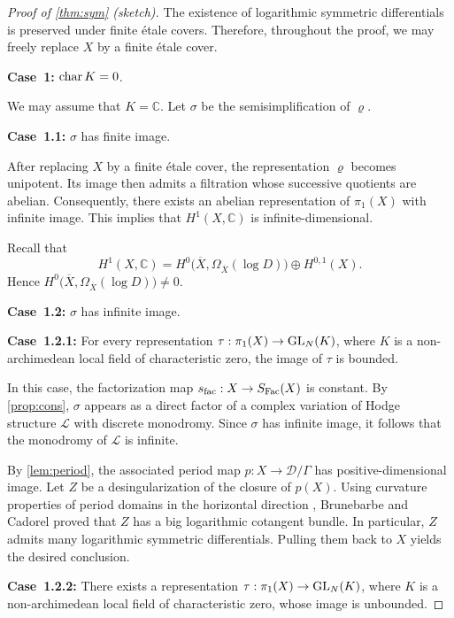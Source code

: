 \documentclass[english]{amsproc}
\theoremstyle{plain}
\theoremstyle{definition}
\theoremstyle{remark}
\theoremstyle{plain}
\numberwithin{equation}{thm} %
\newcommand{\sD}{\mathscr{D}}
\newcommand{\bC}{\mathbb{C}}
\newcommand{\GL}{{\rm GL}}
\begin{document}
\begin{proof}[Proof  of \cref{thm:sym} (sketch)]
	The existence of logarithmic symmetric differentials is preserved under finite \'etale covers.
	Therefore, throughout the proof, we may freely replace $X$ by a finite \'etale cover.
	
	\medskip
	\noindent\textbf{Case~1:} ${\rm char}\, K = 0$.
	
	We may assume that $K=\bC$. Let $\sigma$ be the semisimplification of $\varrho$.
	
	\medskip
	\noindent\textbf{Case~1.1:} $\sigma$ has finite image.
	
	After replacing $X$ by a finite \'etale cover, the representation $\varrho$ becomes unipotent.
	Its image then admits a filtration whose successive quotients are abelian. Consequently,
	there exists an abelian representation of $\pi_1(X)$ with infinite image. This implies that
	$H^1(X,\bC)$ is infinite-dimensional.
	
	Recall that
	\[
	H^1(X,\bC)
	= H^0\bigl(\overline{X}, \Omega_{\overline{X}}(\log D)\bigr)
	\oplus H^{0,1}(X).
	\]
	Hence $H^0\bigl(\overline{X}, \Omega_{\overline{X}}(\log D)\bigr)\neq 0$.
	
	\medskip
	\noindent\textbf{Case~1.2:} $\sigma$ has infinite image.
	
	\medskip
	\noindent\textbf{Case~1.2.1:}  
	For every representation $\tau:\pi_1(X)\to \GL_N(K)$, where $K$ is a non-archimedean local
	field of characteristic zero, the image of $\tau$ is bounded.
	
In this case, the factorization map \(s_{\rm fac}: X \to S_{\rm Fac}(X)\) is constant. 
By \cref{prop:cons}, \(\sigma\) appears as a direct factor of a complex variation of Hodge 
structure \(\mathcal{L}\) with discrete monodromy. 
Since \(\sigma\) has infinite image, it follows that the monodromy of \(\mathcal{L}\) is infinite.
	
	By \cref{lem:period}, the associated period map $p:X\to \sD/\Gamma$ has positive-dimensional
	image. Let $Z$ be a desingularization of the closure of $p(X)$. Using curvature properties
	of period domains in the horizontal direction \cite{Gri70}, Brunebarbe and Cadorel
	\cite{BC20} proved that $Z$ has a big logarithmic cotangent bundle. In particular,
	$Z$ admits many logarithmic symmetric differentials. Pulling them back to $X$ yields
	the desired conclusion.
	
	\medskip
	\noindent\textbf{Case~1.2.2:}  
	There exists a representation $\tau:\pi_1(X)\to \GL_N(K)$, where $K$ is a non-archimedean
	local field of characteristic zero, whose image is unbounded.
	

\end{proof}
\end{document}
